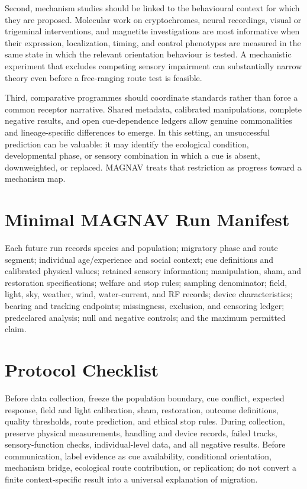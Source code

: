 \documentclass[conference]{IEEEtran}
\begin{document}
Second, mechanism studies should be linked to the behavioural context for which they are proposed. Molecular work on cryptochromes, neural recordings, visual or trigeminal interventions, and magnetite investigations are most informative when their expression, localization, timing, and control phenotypes are measured in the same state in which the relevant orientation behaviour is tested. A mechanistic experiment that excludes competing sensory impairment can substantially narrow theory even before a free-ranging route test is feasible.

Third, comparative programmes should coordinate standards rather than force a common receptor narrative. Shared metadata, calibrated manipulations, complete negative results, and open cue-dependence ledgers allow genuine commonalities and lineage-specific differences to emerge. In this setting, an unsuccessful prediction can be valuable: it may identify the ecological condition, developmental phase, or sensory combination in which a cue is absent, downweighted, or replaced. MAGNAV treats that restriction as progress toward a mechanism map.

\appendices
\section{Minimal MAGNAV Run Manifest}
Each future run records species and population; migratory phase and route segment; individual age/experience and social context; cue definitions and calibrated physical values; retained sensory information; manipulation, sham, and restoration specifications; welfare and stop rules; sampling denominator; field, light, sky, weather, wind, water-current, and RF records; device characteristics; bearing and tracking endpoints; missingness, exclusion, and censoring ledger; predeclared analysis; null and negative controls; and the maximum permitted claim.

\section{Protocol Checklist}
Before data collection, freeze the population boundary, cue conflict, expected response, field and light calibration, sham, restoration, outcome definitions, quality thresholds, route prediction, and ethical stop rules. During collection, preserve physical measurements, handling and device records, failed tracks, sensory-function checks, individual-level data, and all negative results. Before communication, label evidence as cue availability, conditional orientation, mechanism bridge, ecological route contribution, or replication; do not convert a finite context-specific result into a universal explanation of migration.
\end{document}
